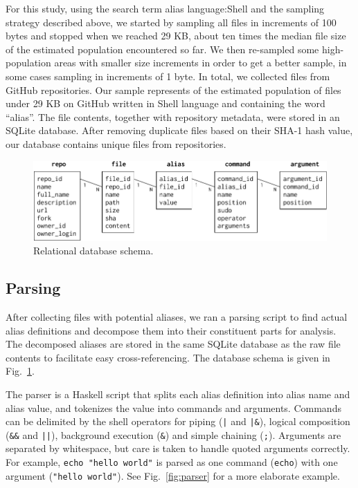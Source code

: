 \documentclass[smallextended,natbib]{svjour3}
\newcommand{\num}[1]{\numprint{#1}}
\newcommand{\per}[1]{\numprint[\%]{#1}}
\newenvironment{CVerbatim}
  {\center\BVerbatim}
  {\endBVerbatim\endcenter}
\begin{document}
For this study, using the search term
\begin{CVerbatim}
alias language:Shell
\end{CVerbatim}
and the sampling strategy described above, we started by sampling all files in increments of 100 bytes and stopped when we reached 29 KB, about ten times the median file size of the estimated population encountered so far.
We then re-sampled some high-population areas with smaller size increments in order to get a better sample, in some cases sampling in increments of 1 byte.
In total, we collected \num{844140} files from \num{304361} GitHub repositories.
Our sample represents \per{94.09} of the estimated population of \num{897182} files under 29 KB on GitHub written in Shell language and containing the word ``alias''.
The file contents, together with repository metadata, were stored in an SQLite database.
After removing duplicate files based on their SHA-1 hash value, our database contains \num{372816} unique files from \num{205126} repositories.

\begin{figure}
    \centering
    \includegraphics[width=\columnwidth]{fig-schema.pdf}
    \caption{Relational database schema.}
    \label{fig:schema}
\end{figure}

\subsection{Parsing}

After collecting files with potential aliases, we ran a parsing script to find actual alias definitions and decompose them into their constituent parts for analysis.
The decomposed aliases are stored in the same SQLite database as the raw file contents to facilitate easy cross-referencing.
The database schema is given in Fig.~\ref{fig:schema}.

The parser is a Haskell script that splits each alias definition into alias name and alias value, and tokenizes the value into commands and arguments.
Commands can be delimited by the shell operators for piping (\verb!|! and \verb!|&!), logical composition (\verb|&&| and \verb!||!), background execution (\verb|&|) and simple chaining (\verb|;|).
Arguments are separated by whitespace, but care is taken to handle quoted arguments correctly. 
For example, \verb|echo "hello world"| is parsed as one command (\texttt{echo}) with one argument (\texttt{"hello world"}).
See Fig.~\ref{fig:parser} for a more elaborate example.
\end{document}
